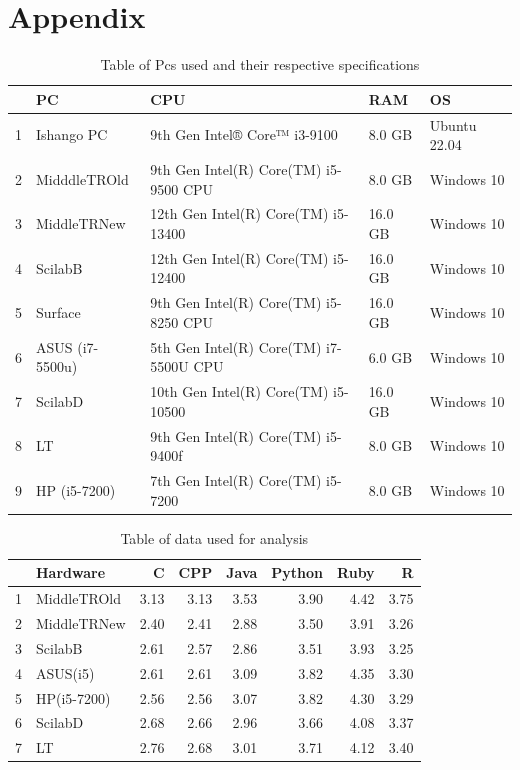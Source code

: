 \documentclass[12pt,halfline,a4paper,]{ouparticle}
\begin{document}
\newpage

\hypertarget{appendix}{%
\section{Appendix}\label{appendix}}

\begin{table}[ht]
\centering
\begin{tabular}{rllll}
  \hline
 & PC & CPU & RAM & OS \\ 
  \hline
1 & Ishango PC &  9th Gen Intel® Core™ i3-9100  &  8.0 GB  & Ubuntu 22.04 \\ 
  2 & MidddleTROld &  9th Gen Intel(R) Core(TM) i5-9500 CPU  &  8.0 GB  &   Windows 10 \\ 
  3 & MiddleTRNew  &  12th Gen Intel(R) Core(TM) i5-13400  &  16.0 GB  &   Windows 10 \\ 
  4 & ScilabB  &   12th Gen Intel(R) Core(TM) i5-12400  &   16.0 GB   &   Windows 10 \\ 
  5 & Surface  &   9th Gen Intel(R) Core(TM) i5-8250 CPU  &   16.0 GB   &   Windows 10 \\ 
  6 & ASUS (i7-5500u)  &   5th Gen Intel(R) Core(TM) i7-5500U CPU  &   6.0 GB   &   Windows 10 \\ 
  7 & ScilabD  &   10th Gen Intel(R) Core(TM) i5-10500  &   16.0 GB   &   Windows 10 \\ 
  8 & LT  &   9th Gen Intel(R) Core(TM) i5-9400f  &   8.0 GB   &   Windows 10 \\ 
  9 & HP (i5-7200)  &   7th Gen Intel(R) Core(TM) i5-7200  &   8.0 GB   &   Windows 10 \\ 
   \hline
\end{tabular}
\caption{Table of Pcs used and their respective specifications} 
\end{table}

\begin{table}[ht]
\centering
\begin{tabular}{rlrrrrrr}
  \hline
 & Hardware & C & CPP & Java & Python & Ruby & R \\ 
  \hline
1 & MiddleTROld & 3.13 & 3.13 & 3.53 & 3.90 & 4.42 & 3.75 \\ 
  2 & MiddleTRNew & 2.40 & 2.41 & 2.88 & 3.50 & 3.91 & 3.26 \\ 
  3 & ScilabB & 2.61 & 2.57 & 2.86 & 3.51 & 3.93 & 3.25 \\ 
  4 & ASUS(i5) & 2.61 & 2.61 & 3.09 & 3.82 & 4.35 & 3.30 \\ 
  5 & HP(i5-7200) & 2.56 & 2.56 & 3.07 & 3.82 & 4.30 & 3.29 \\ 
  6 & ScilabD & 2.68 & 2.66 & 2.96 & 3.66 & 4.08 & 3.37 \\ 
  7 & LT & 2.76 & 2.68 & 3.01 & 3.71 & 4.12 & 3.40 \\ 
   \hline
\end{tabular}
\caption{Table of data used for analysis} 
\end{table}
\begingroup\fontsize{9}{11}\selectfont
\end{document}
